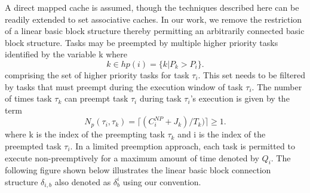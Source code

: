 A direct mapped cache is assumed, though the techniques described here can be readily extended to set associative caches.  In our work, we remove the restriction of a linear basic block structure thereby permitting an arbitrarily connected basic block structure.  Tasks may be preempted by multiple higher priority tasks identified by the variable k where
\begin{equation}\label{eqn:hp-tasks}
    k \in hp(i) = \{k | P_{k} > P_{i}\}.
\end{equation}
\noindent
comprising the set of higher priority tasks for task \begin{math}\tau_{i}\end{math}.  This set needs to be filtered by tasks that must preempt during the execution window of task \begin{math}\tau_{i}\end{math}.  The number of times task \begin{math}\tau_{k}\end{math} can preempt task \begin{math}\tau_{i}\end{math} during task \begin{math}\tau_{i}\end{math}'s execution is given by the term
\begin{equation}\label{eqn:num-preemptions}
    N_{p}(\tau_{i},\tau_{k})=\lceil(C_{i}^{NP} + J_{k})/T_{k})\rceil \geq 1.
\end{equation}
\noindent
where k is the index of the preempting task \begin{math}\tau_{k}\end{math} and i is the index of the preempted task \begin{math}\tau_{i}\end{math}.  In a limited preemption approach, each task is permitted to execute non-preemptively for a maximum amount of time denoted by \begin{math}Q_{i}\end{math}.  The following figure shown below illustrates the linear basic block connection structure \begin{math}\delta_{i,b}\end{math} also denoted as \begin{math}\delta_{b}^{i}\end{math} using our convention.

